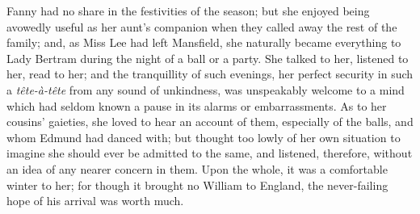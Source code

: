 Fanny had no share in the festivities of the season;
but she enjoyed being avowedly useful as her aunt's companion
when they called away the rest of the family; and, as Miss
Lee had left Mansfield, she naturally became everything
to Lady Bertram during the night of a ball or a party.
She talked to her, listened to her, read to her;
and the tranquillity of such evenings, her perfect security
in such a \emph{t\^{e}te-\`{a}-t\^{e}te} from any sound of unkindness,
was unspeakably welcome to a mind which had seldom
known a pause in its alarms or embarrassments.  As to
her cousins' gaieties, she loved to hear an account of them,
especially of the balls, and whom Edmund had danced with;
but thought too lowly of her own situation to imagine
she should ever be admitted to the same, and listened,
therefore, without an idea of any nearer concern in them.
Upon the whole, it was a comfortable winter to her;
for though it brought no William to England, the never-failing
hope of his arrival was worth much.

